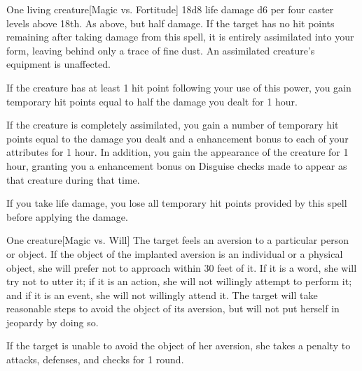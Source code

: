 \spellrng{\rngtouch}
\begin{spelltarget}{One living creature}[Magic vs. Fortitude]
    \spellsuccess 18d8 life damage \add d6 per four caster levels above 18th. 
    \spellfailure As above, but half damage.
    \spelleffect If the target has no hit points remaining after taking damage from this spell, it is entirely assimilated into your form, leaving behind only a trace of fine dust. An assimilated creature's equipment is unaffected.
    \par If the creature has at least 1 hit point following your use of this power, you gain temporary hit points equal to half the damage you dealt for 1 hour.
    \par If the creature is completely assimilated, you gain a number of temporary hit points equal to the damage you dealt and a  enhancement bonus to each of your attributes for 1 hour. In addition, you gain the appearance of the creature for 1 hour, granting you a  enhancement bonus on Disguise checks made to appear as that creature during that time.
\end{spelltarget}
\spellnotes If you take life damage, you lose all temporary hit points provided by this spell before applying the damage.

\spellrng{\rngmed}
\spelldur{\durshort}
\begin{spelltarget}{One creature}[Magic vs. Will]
    \spellsuccess The target feels an aversion to a particular person or object. If the object of the implanted aversion is an individual or a physical object, she will prefer not to approach within 30 feet of it. If it is a word, she will try not to utter it; if it is an action, she will not willingly attempt to perform it; and if it is an event, she will not willingly attend it. The target will take reasonable steps to avoid the object of its aversion, but will not put herself in jeopardy by doing so.
    \par If the target is unable to avoid the object of her aversion, she takes a  penalty to attacks, defenses, and checks for 1 round.
\end{spelltarget}

